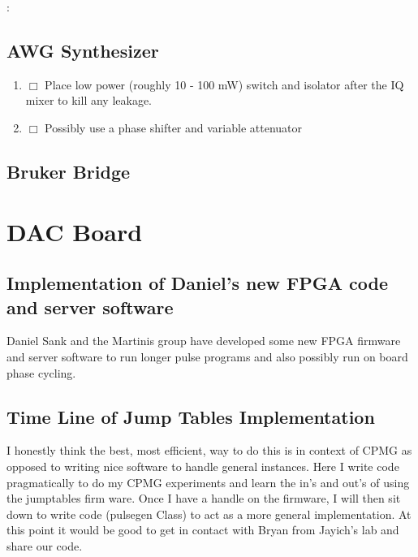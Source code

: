 \documentclass[10pt]{book}
\begin{document}
{\begin{minipage}{0.5\linewidth}
\hrulefill 

{\color{red}{\tiny file:}:}\begin{tiny}\end{tiny} 

\hrulefill

\end{minipage}}

\section{AWG Synthesizer}
\begin{enumerate}
	\item $\Box$ Place low power (roughly 10 - 100 mW) switch and isolator after the IQ mixer to kill any leakage.
	\item $\Box$ Possibly use a phase shifter and variable attenuator 
\end{enumerate}


\section{Bruker Bridge}

\chapter{DAC Board}
\section{Implementation of Daniel's new FPGA code and server software}
Daniel Sank and the Martinis group have developed some new FPGA firmware and server software to run longer pulse programs and also possibly run on board phase cycling.

\section{Time Line of Jump Tables Implementation}

I honestly think the best, most efficient, way to do this is in context of CPMG as opposed to writing nice software to handle general instances. Here I write code pragmatically to do my CPMG experiments and learn the in's and out's of using the jumptables firm ware. Once I have a handle on the firmware, I will then sit down to write code (pulsegen Class) to act as a more general implementation. At this point it would be good to get in contact with Bryan from Jayich's lab and share our code. \\
\end{document}
